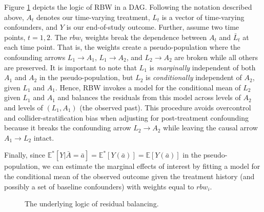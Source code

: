 Figure \ref{fig:1} depicts the logic of RBW in a DAG. Following the
notation described above, \(A_{t}\) denotes our time-varying treatment,
\(L_{t}\) is a vector of time-varying confounders, and \(Y\) is our
end-of-study outcome. Further, assume two time points, \(t=1,2\). The
\(rbw_{i}\) weights break the dependence between \(A_{t}\) and
\(\bar{L}_{t}\) at each time point. That is, the weights create a
pseudo-population where the confounding arrows
\(L_{1}\rightarrow A_{1}\), \(L_{1}\rightarrow A_{2}\), and
\(L_{2}\rightarrow A_{2}\) are broken while all others are preserved. It
is important to note that \(L_{1}\) is \emph{marginally} independent of
both \(A_{1}\) and \(A_{2}\) in the pseudo-population, but \(L_{2}\) is
\emph{conditionally} independent of \(A_{2}\), given \(L_{1}\) and
\(A_{1}\). Hence, RBW invokes a model for the conditional mean of
\(L_{2}\) given \(L_{1}\) and \(A_{1}\) and balances the residuals from
this model across levels of \(A_{2}\) and levels of \((L_{1}, A_{1})\)
(the observed past). This procedure avoids overcontrol and
collider-stratification bias when adjusting for post-treatment
confounding because it breaks the confounding arrow
\(L_{2}\rightarrow A_{2}\) while leaving the causal arrow
\(A_{1}\rightarrow L_{2}\) intact.

Finally, since
\(\mathbb{E}^{*}[Y|\bar{A}=\bar{a}]=\mathbb{E}^{*}[Y(\bar{a})]=\mathbb{E}[Y(\bar{a})]\)
in the pseudo-population, we can estimate the marginal effects of
interest by fitting a model for the conditional mean of the observed
outcome given the treatment history (and possibly a set of baseline
confounders) with weights equal to \(rbw_{i}\).

\begin{figure} [ht]
\begin{center}
\end{center}
\caption{The underlying logic of residual balancing.}
\label{fig:1}
\end{figure}

